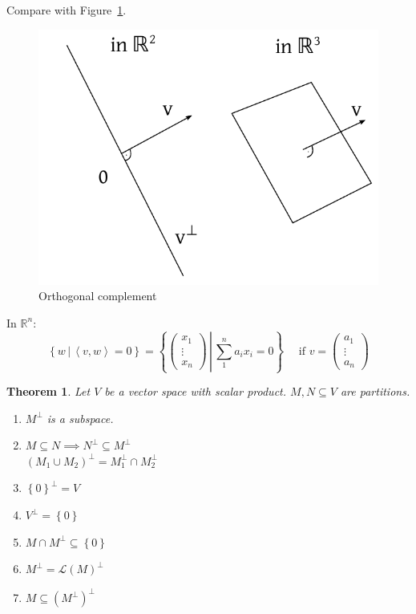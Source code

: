 \documentclass[a4paper]{article}
\newcounter{lecref}[section]
\numberwithin{lecref}{section}
\newtheorem{theorem}[lecref]{Theorem}
\newcommand{\set}[1]{\left\{#1\right\}}
\newcommand{\setdef}[2]{\left\{\left.#1\,\right|\,#2\right\}}
\newcommand{\ip}[2]{\left\langle#1,#2\right\rangle} %
\begin{document}
Compare with Figure~\ref{orthocomp}.
\begin{figure}[!ht]
  \begin{center}
    \includegraphics{img/07_orthogonal_complement.pdf}
    \caption{Orthogonal complement}
    \label{orthocomp}
  \end{center}
\end{figure}

In $\mathbb R^n$:
\[ \setdef{w}{\ip vw = 0} = \setdef{\begin{pmatrix} x_1 \\ \vdots \\ x_n \end{pmatrix}}{\sum_{1}^n a_i x_i = 0} \quad \text{ if } v = \begin{pmatrix} a_1 \\ \vdots \\ a_n \end{pmatrix} \]

\begin{theorem} %
  \label{thm841}
  Let $V$ be a vector space with scalar product. $M, N \subseteq V$ are partitions.
  \begin{enumerate}
    \item $M^\bot$ is a subspace.
    \item $M \subseteq N \implies N^\bot \subseteq M^\bot$ \\
      $(M_1 \cup M_2)^\bot = M_1^\bot \cap M_2^\bot$
    \item $\set{0}^\bot = V$
    \item $V^\bot = \set{0}$
    \item $M \cap M^\bot \subseteq \set{0}$
    \item $M^\bot = \mathcal L(M)^\bot$
    \item $M \subseteq (M^\bot)^\bot$
  \end{enumerate}
\end{theorem}
\end{document}
